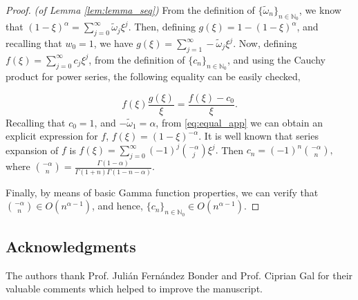 \documentclass{amsart}
\newcommand{\w}{\omega}
\newcommand{\eps}{\varepsilon}
\newcommand{\wtilde}{\tilde{\w}}
\theoremstyle{remark}
\theoremstyle{definition}
\numberwithin{equation}{section}
\begin{document}
\begin{proof}\textit{(of Lemma \ref{lem:lemma_seq})}
From the definition of $\{\wtilde_n\}_{n \in \mathbb{N}_0}$, we know that
$(1 - \xi)^{\alpha} = \sum^{\infty}_{j=0} \wtilde_j \xi^j. $
Then, defining $g(\xi) = 1 - (1 - \xi)^{\alpha}$, and recalling that $w_0 = 1$,  we have $g(\xi) = \sum^{\infty}_{j=1} -\wtilde_j \xi^j. $
Now, defining $f(\xi) = \sum^{\infty}_{j=0} c_j \xi^j$, from the definition of $\{c_n\}_{n \in \mathbb{N}_0}$, and using the Cauchy product for power series, the following equality can be easily checked, 

\begin{equation}
\label{eq:equal_app}
 f(\xi) \frac{g(\xi)}{\xi} = \frac{f(\xi) - c_0}{\xi}.
\end{equation} 
Recalling that $c_0 = 1$, and $-\wtilde_1 = \alpha$, from \eqref{eq:equal_app} we can obtain an explicit expression for $f$, $f(\xi) = (1-\xi)^{-\alpha}.$ 
It is well known that series expansion of $f$ is 
$f(\xi) =  \sum^{\infty}_{j=0} (-1)^{j} {-\alpha \choose j } \xi^j.$
Then $c_n = (-1)^{n} {-\alpha \choose n },$ 
where ${-\alpha \choose n } = \frac{\Gamma(1-\alpha)}{\Gamma(1 + n)\Gamma(1 - n -\alpha)}.$


Finally, by means of basic Gamma function properties, we can verify that ${-\alpha \choose n } \in O(n^{\alpha-1})$, and hence, $\{c_n\}_{n \in \mathbb{N}_0} \in O(n^{\alpha-1})$.  \end{proof}
 


\subsection*{Acknowledgments} The authors thank Prof. Juli\'an Fern\'andez Bonder and Prof. Ciprian Gal for their valuable comments which helped to improve the manuscript. 

%
%






{}

\end{document}
